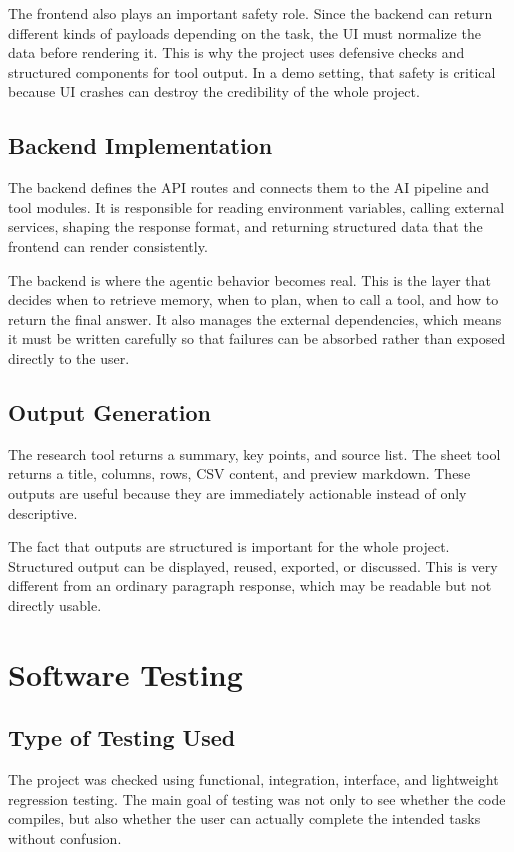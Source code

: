 \documentclass[11pt,oneside]{report}
\begin{document}
The frontend also plays an important safety role. Since the backend can return different kinds of payloads depending on the task, the UI must normalize the data before rendering it. This is why the project uses defensive checks and structured components for tool output. In a demo setting, that safety is critical because UI crashes can destroy the credibility of the whole project.

\section{Backend Implementation}
The backend defines the API routes and connects them to the AI pipeline and tool modules. It is responsible for reading environment variables, calling external services, shaping the response format, and returning structured data that the frontend can render consistently.

The backend is where the agentic behavior becomes real. This is the layer that decides when to retrieve memory, when to plan, when to call a tool, and how to return the final answer. It also manages the external dependencies, which means it must be written carefully so that failures can be absorbed rather than exposed directly to the user.

\section{Output Generation}
The research tool returns a summary, key points, and source list. The sheet tool returns a title, columns, rows, CSV content, and preview markdown. These outputs are useful because they are immediately actionable instead of only descriptive.

The fact that outputs are structured is important for the whole project. Structured output can be displayed, reused, exported, or discussed. This is very different from an ordinary paragraph response, which may be readable but not directly usable.

\chapter{Software Testing}
\section{Type of Testing Used}
The project was checked using functional, integration, interface, and lightweight regression testing. The main goal of testing was not only to see whether the code compiles, but also whether the user can actually complete the intended tasks without confusion.
\end{document}
